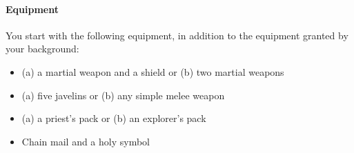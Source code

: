 \paragraph{Equipment}\label{_equipment_2}

You start with the following equipment, in addition to the equipment
granted by your background:

\begin{itemize}
\item
  (a) a martial weapon and a shield or (b) two martial weapons
\item
  (a) five javelins or (b) any simple melee weapon
\item
  (a) a priest's pack or (b) an explorer's pack
\item
  Chain mail and a holy symbol
\end{itemize}


